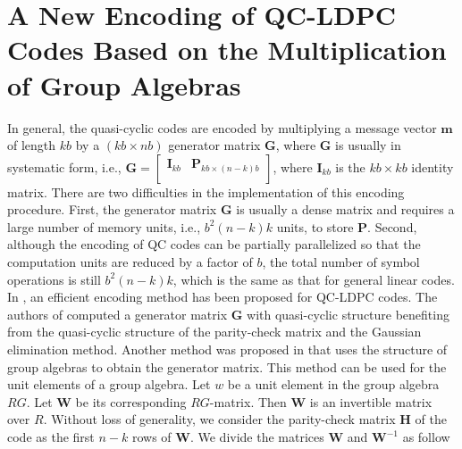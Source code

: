 \documentclass[journal,draftclsnofoot,onecolumn,12pt,twoside]{IEEEtran}
\begin{document}
\section{A New Encoding of QC-LDPC Codes Based on the Multiplication of Group Algebras}\label{sec5_2}
In general, the quasi-cyclic codes  are encoded by multiplying a message vector $\mathbf{m}$ of length $kb$ by a $(kb\times nb)$ generator matrix $\mathbf{G}$, where $\mathbf{G}$  is usually in systematic form, i.e., $\mathbf{G} = \left[
                                            \begin{array}{cc}
                                              \mathbf{I}_{kb} & \mathbf{P}_{kb\times (n-k)b} \\
                                            \end{array}
                                          \right]$, where
$\mathbf{I}_{kb}$ is  the $kb\times kb$ identity matrix. There are two difficulties in the implementation of this encoding procedure. First, the generator matrix $\mathbf{G}$ is usually a dense matrix and requires a large number of memory units, i.e., $b^2(n-k)k$ units, to store $\mathbf{P}$. Second, although the encoding of QC codes can be partially parallelized so that the computation units are reduced by a factor of $b$, the total number of symbol operations is still $b^2(n-k)k$, which is the same as that for general linear codes. In \cite{4}, an efficient encoding method has been proposed for QC-LDPC codes. The authors of \cite{4}  computed a generator matrix $\mathbf{G}$ with quasi-cyclic structure benefiting from the quasi-cyclic structure of the parity-check matrix and the Gaussian elimination method. Another method was proposed in \cite{1} that uses the structure of group algebras to obtain the generator matrix. This method can be used for the unit elements of a group algebra. Let $w$ be a unit element in the group algebra $RG$. Let $\mathbf{W}$ be its corresponding $RG$-matrix. Then $\mathbf{W}$ is an invertible matrix over $R$. Without loss of generality, we consider the parity-check matrix $\mathbf{H}$ of the code as the first $n-k$ rows of $\mathbf{W}$. We divide the matrices $\mathbf{W}$ and $\mathbf{W}^{-1}$ as follow
\end{document}
